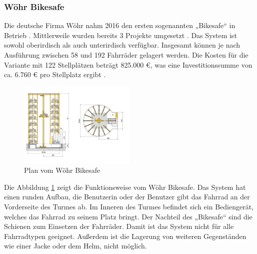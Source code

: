 \subsubsection{Wöhr Bikesafe}
Die deutsche Firma Wöhr nahm 2016 den ersten sogenannten „Bikesafe“ in Betrieb . Mittlerweile wurden bereits 3 Projekte umgesetzt . Das System ist sowohl oberirdisch als auch unterirdisch verfügbar. Insgesamt können je nach Ausführung zwischen 58 und 192 Fahrräder gelagert werden. Die Kosten für die Variante mit 122 Stellplätzen beträgt 825.000 \euro{}, was eine Investitionssumme von ca. 6.760 \euro{} pro Stellplatz ergibt \cite*{richtpreisangebot}.

\begin{figure}[H]
    \centering
    \includegraphics[width=0.5\textwidth]{images/bikesafe.png}
    \caption{Plan vom Wöhr Bikesafe }
    \label{fig:bikesafe}
\end{figure}

Die Abbildung \ref{fig:bikesafe} zeigt die Funktionsweise vom Wöhr Bikesafe. Das System hat einen runden Aufbau, die Benutzerin oder der Benutzer gibt das Fahrrad an der Vorderseite des Turmes ab. Im Inneren des Turmes befindet sich ein Bediengerät, welches das Fahrrad zu seinem Platz bringt.
\noindent Der Nachteil des „Bikesafe“ sind die Schienen zum Einsetzen der Fahrräder. Damit ist das System nicht für alle Fahrradtypen geeignet. Außerdem ist die Lagerung von weiteren Gegenständen wie einer Jacke oder dem Helm, nicht möglich.
